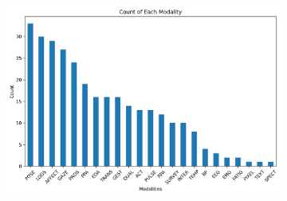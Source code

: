 \documentclass[manuscript,screen,review]{acmart}
\begin{document}
\begin{figure}[htbp]
    \centering

    
    
    \begin{subfigure}[b]{0.45\textwidth}
        \includegraphics[width=\textwidth]{img/statistical_imgs/modalities.png}
        
        

\end{subfigure}
\end{figure}
\end{document}
